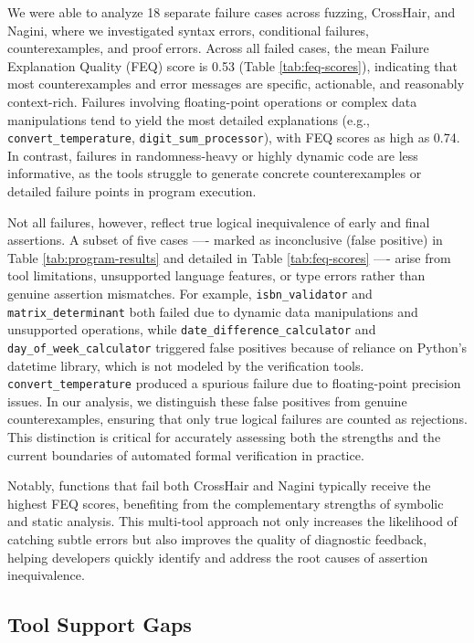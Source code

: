 \documentclass[8pt]{extarticle}
\begin{document}
We were able to analyze 18 separate failure cases across fuzzing, CrossHair, and Nagini, where we investigated syntax errors, conditional failures, counterexamples, and proof errors. Across all failed cases, the mean Failure Explanation Quality (FEQ) score is 0.53 (Table \ref{tab:feq-scores}), indicating that most counterexamples and error messages are specific, actionable, and reasonably context-rich. Failures involving floating-point operations or complex data manipulations tend to yield the most detailed explanations (e.g., \texttt{convert\_temperature}, \texttt{digit\_sum\_processor}), with FEQ scores as high as 0.74. In contrast, failures in randomness-heavy or highly dynamic code are less informative, as the tools struggle to generate concrete counterexamples or detailed failure points in program execution.

Not all failures, however, reflect true logical inequivalence of early and final assertions. A subset of five cases ---- marked as inconclusive (false positive) in Table \ref{tab:program-results} and detailed in Table \ref{tab:feq-scores} ---- arise from tool limitations, unsupported language features, or type errors rather than genuine assertion mismatches. For example, \texttt{isbn\_validator} and \texttt{matrix\_determinant} both failed due to dynamic data manipulations and unsupported operations, while \texttt{date\_difference\_calculator} and \texttt{day\_of\_week\_calculator} triggered false positives because of reliance on Python's datetime library, which is not modeled by the verification tools. \texttt{convert\_temperature} produced a spurious failure due to floating-point precision issues. In our analysis, we distinguish these false positives from genuine counterexamples, ensuring that only true logical failures are counted as rejections. This distinction is critical for accurately assessing both the strengths and the current boundaries of automated formal verification in practice.

Notably, functions that fail both CrossHair and Nagini typically receive the highest FEQ scores, benefiting from the complementary strengths of symbolic and static analysis. This multi-tool approach not only increases the likelihood of catching subtle errors but also improves the quality of diagnostic feedback, helping developers quickly identify and address the root causes of assertion inequivalence.

\subsection{Tool Support Gaps} 
\end{document}
